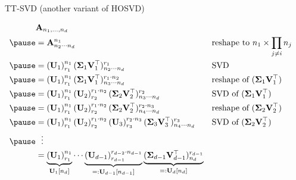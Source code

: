 \documentclass{beamer}
\newcommand{\bgk}[1]{\boldsymbol{#1}}
\newcommand{\bSigma}{\bgk{\Sigma}}
\newcommand{\bvec}[1]{\mathbf{#1}}
\newcommand{\vA}{\bvec{A}}
\newcommand{\vU}{\bvec{U}}
\newcommand{\vV}{\bvec{V}}
\begin{document}
\begin{frame}{TT-SVD (another variant of HOSVD)}

$$
\begin{aligned}
&\vA_{n_1,...,n_d}\\
\pause
&=
\vA_{n_2\cdots n_d}^{n_1} &&\text{reshape to}~n_1 \times \prod_{j\neq i} n_j\\ \pause
&=
\left(\vU_1\right)_{r_1}^{n_1} (\bSigma_1 \vV_1^\top)_{n_2\cdots n_d}^{r_1}&&\text{SVD}\\ \pause
&=
\left(\vU_1\right)_{r_1}^{n_1}
(\bSigma_1\vV_1^\top)_{n_3\cdots n_d}^{r_1 \cdot n_2}&&\text{reshape of}~ (\bSigma_1\vV_1^\top)\\ \pause
&=
\left(\vU_1\right)_{r_1}^{n_1}
\left(\vU_2\right)^{r_1 \cdot n_2}_{r_2} 
(\bSigma_2\vV_2^\top)_{n_3\cdots n_d}^{r_2}&&\text{SVD of}~ (\bSigma_1\vV_1^\top)\\ \pause
&=
\left(\vU_1\right)_{r_1}^{n_1}
\left(\vU_2\right)^{r_1 \cdot n_2}_{r_2} 
(\bSigma_2\vV_2^\top)_{n_4\cdots n_d}^{r_2\cdot n_3 }&&\text{reshape of}~ (\bSigma_2\vV_2^\top)\\ \pause
&=
\left(\vU_1\right)_{r_1}^{n_1}
\left(\vU_2\right)^{r_1 \cdot n_2}_{r_2}
\left(\vU_3\right)^{r_2 \cdot n_3}_{r_3}
(\bSigma_3\vV_3^\top)_{n_4\cdots n_d}^{r_3}&&\text{SVD of}~ (\bSigma_2\vV_2^\top)\\ \pause
&~~\vdots\\
&=
\underbrace{\left(\vU_1\right)_{r_1}^{n_1}}_{\vU_1[n_d]}
\cdots
\underbrace{\left(\vU_{d-1}\right)^{r_{d-2} \cdot n_{d-1}}_{r_{d-1}}}_{=:\vU_{d-1}[n_{d-1}]}
\underbrace{(\bSigma_{d-1}\vV_{d-1}^\top)_{n_d}^{r_{d-1}}}_{=:\vU_{d}[n_d]}
\end{aligned}
$$
    
\end{frame}
\end{document}
